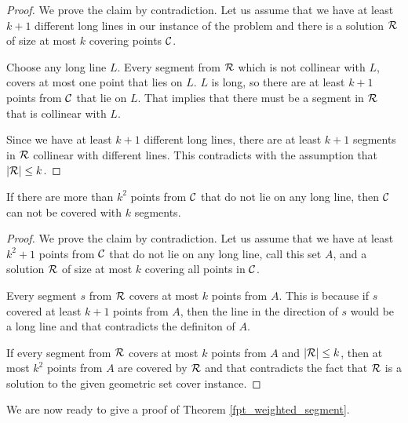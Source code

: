 \begin{proof}
We prove the claim by contradiction.
Let us assume that we have at least $k+1$ different
long lines in our instance of the problem
and there is a solution $\mathcal{R}$ of size at most $k$
covering points $\mathcal{C}$.

Choose any long line $L$.
Every segment from $\mathcal{R}$ which is not collinear with $L$,
covers at most one point that lies on $L$.
$L$ is long, so there are at least $k+1$ points from $\mathcal{C}$ that lie on $L$.
That implies that there must be a segment in $\mathcal{R}$ that is
collinear with $L$.

Since we have at least $k+1$ different long lines,
there are at least $k+1$
segments in $\mathcal{R}$ collinear with different lines.
This contradicts with the assumption that $|\mathcal{R}| \le k$.
\end{proof}

\begin{claim}
\label{few_points}
If there are more than $k^2$ points from $\mathcal{C}$
that do not lie on any long line,
then $\mathcal{C}$ can not be covered with $k$ segments.
\end{claim}

\begin{proof}
We prove the claim by contradiction.
Let us assume that we have at least $k^2+1$ points
from $\mathcal{C}$ that do not lie on any long line, call this set $A$,
and a solution $\mathcal{R}$ of size at most $k$
covering all points in $\mathcal{C}$.

Every segment $s$ from $\mathcal{R}$ covers at most $k$
points from $A$.
This is because if $s$ covered at least $k+1$ points from $A$,
then the line in the direction of $s$ would be a long line
and that contradicts the definiton of $A$.

If every segment from $\mathcal{R}$ covers at most $k$ points from $A$
and $|\mathcal{R}| \le k$, then at most $k^2$ points from $A$ are covered by $\mathcal{R}$
and that contradicts the fact that $\mathcal{R}$ is a solution to the given
geometric set cover instance.
\end{proof}

We are now ready to give a proof of Theorem \ref{fpt_weighted_segment}.

